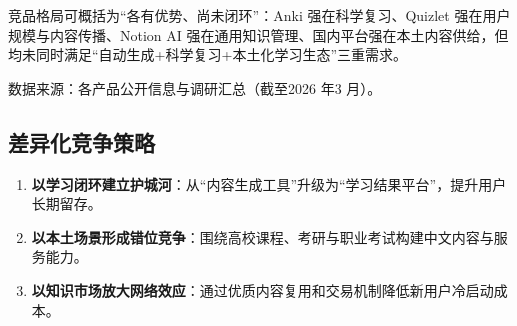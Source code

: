 竞品格局可概括为“各有优势、尚未闭环”：Anki 强在科学复习、Quizlet 强在用户规模与内容传播、Notion AI 强在通用知识管理、国内平台强在本土内容供给，但均未同时满足“自动生成+科学复习+本土化学习生态”三重需求。

\begin{table}[htbp]
	\centering
	\caption{核心竞品多维对比}
	\label{tab:chap3_competitor}
	\begin{flushleft}
		\footnotesize 数据来源：各产品公开信息与调研汇总（截至2026 年3 月）。
	\end{flushleft}
\end{table}

\subsection{差异化竞争策略}

\begin{enumerate}[leftmargin=2em]
	\item \textbf{以学习闭环建立护城河}：从“内容生成工具”升级为“学习结果平台”，提升用户长期留存。
	\item \textbf{以本土场景形成错位竞争}：围绕高校课程、考研与职业考试构建中文内容与服务能力。
	\item \textbf{以知识市场放大网络效应}：通过优质内容复用和交易机制降低新用户冷启动成本。
\end{enumerate}

